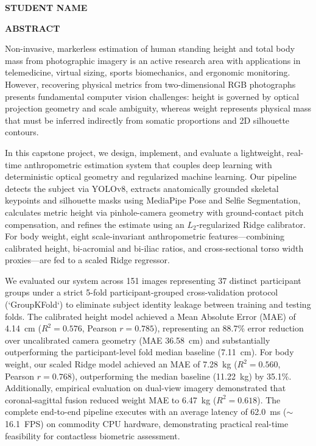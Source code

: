 \documentclass[12pt,a4paper,oneside]{report}
\begin{document}
\vspace{1.2cm}
\noindent\begin{flushright}
\textbf{STUDENT NAME}
\end{flushright}

\clearpage
\begin{center}
{\Large\bfseries ABSTRACT\par}
\end{center}
\vspace{0.6cm}

\noindent Non-invasive, markerless estimation of human standing height and total body mass from photographic imagery is an active research area with applications in telemedicine, virtual sizing, sports biomechanics, and ergonomic monitoring. However, recovering physical metrics from two-dimensional RGB photographs presents fundamental computer vision challenges: height is governed by optical projection geometry and scale ambiguity, whereas weight represents physical mass that must be inferred indirectly from somatic proportions and 2D silhouette contours.

\noindent In this capstone project, we design, implement, and evaluate a lightweight, real-time anthropometric estimation system that couples deep learning with deterministic optical geometry and regularized machine learning. Our pipeline detects the subject via YOLOv8, extracts anatomically grounded skeletal keypoints and silhouette masks using MediaPipe Pose and Selfie Segmentation, calculates metric height via pinhole-camera geometry with ground-contact pitch compensation, and refines the estimate using an $L_2$-regularized Ridge calibrator. For body weight, eight scale-invariant anthropometric features---combining calibrated height, bi-acromial and bi-iliac ratios, and cross-sectional torso width proxies---are fed to a scaled Ridge regressor.

\noindent We evaluated our system across 151 images representing 37 distinct participant groups under a strict 5-fold participant-grouped cross-validation protocol (`GroupKFold`) to eliminate subject identity leakage between training and testing folds. The calibrated height model achieved a Mean Absolute Error (MAE) of 4.14~cm ($R^2=0.576$, Pearson $r=0.785$), representing an 88.7\% error reduction over uncalibrated camera geometry (MAE 36.58~cm) and substantially outperforming the participant-level fold median baseline (7.11~cm). For body weight, our scaled Ridge model achieved an MAE of 7.28~kg ($R^2=0.560$, Pearson $r=0.768$), outperforming the median baseline (11.22~kg) by 35.1\%. Additionally, empirical evaluation on dual-view imagery demonstrated that coronal-sagittal fusion reduced weight MAE to 6.47~kg ($R^2=0.618$). The complete end-to-end pipeline executes with an average latency of 62.0~ms ($\sim$16.1~FPS) on commodity CPU hardware, demonstrating practical real-time feasibility for contactless biometric assessment.
\end{document}

